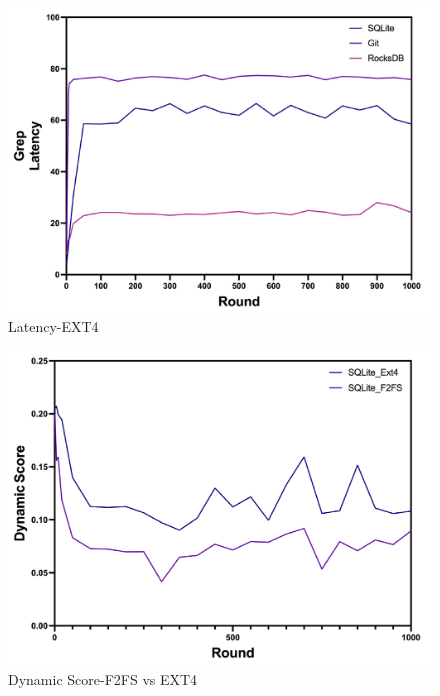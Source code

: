 \begin{figure}[t]
    \centering
	\includegraphics[width=0.95\columnwidth]{graphs/ext_latency}
	\caption{Latency-EXT4}
	\label{f:ext_latency}
\end{figure}

\begin{figure}[t]
    \centering
	\includegraphics[width=0.95\columnwidth]{graphs/f2fs_vs_ext4_dynamic}
	\caption{Dynamic Score-F2FS vs EXT4}
	\label{f:f2fs_vs_ext4_dynamic}
\end{figure}


